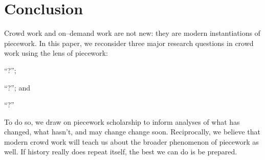 \documentclass[trackingWork]{subfiles}
\begin{document}
\section{Conclusion}
Crowd work and on--demand work are not new: they are modern instantiations of piecework.
In this paper, we reconsider three major research questions in crowd work using the lens of piecework: \begin{inlinelist}
  \item ``?'';
  \item ``?'';
        and
  \item ``?''
\end{inlinelist}
To do so, we draw on piecework scholarship to inform analyses of what has changed, what hasn't, and may change change soon. 
Reciprocally, we believe that modern crowd work will teach us about the broader phenomenon of piecework as well.
If history really does repeat itself, the best we can do is be prepared.
\end{document}
